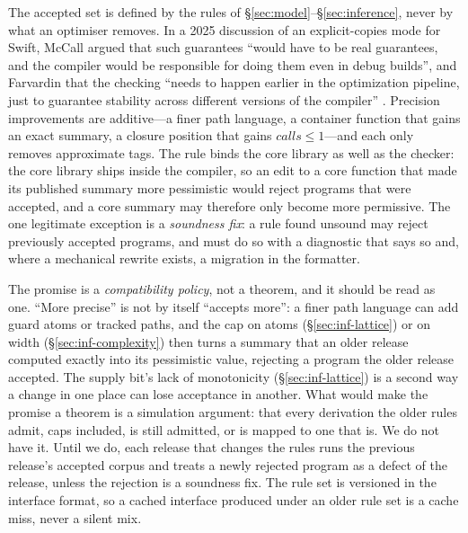 The accepted set is defined by the rules of \S\ref{sec:model}--\S\ref{sec:inference}, never by what an
optimiser removes. In a 2025 discussion of an explicit-copies mode for Swift, McCall argued that such
guarantees ``would have to be real guarantees, and the compiler would be responsible for doing them even
in debug builds'', and Farvardin that the checking ``needs to happen earlier in the optimization
pipeline, just to guarantee stability across different versions of the compiler''
\citep{swift2025explicitcopies}. Precision improvements are additive---a finer path language, a
container function that gains an exact summary, a closure position that gains $\mathit{calls} \le
1$---and each only removes approximate tags. The rule binds the core library as well as the checker:
the core library ships inside the compiler, so an edit to a core function that made its published summary
more pessimistic would reject programs that were accepted, and a core summary may therefore only become
more permissive. The one legitimate exception is a \emph{soundness fix}: a
rule found unsound may reject previously accepted programs, and must do so with a diagnostic that says
so and, where a mechanical rewrite exists, a migration in the formatter.

The promise is a \emph{compatibility policy}, not a theorem, and it should be read as one. ``More precise''
is not by itself ``accepts more'': a finer path language can add guard atoms or tracked paths, and the cap
on atoms (\S\ref{sec:inf-lattice}) or on width (\S\ref{sec:inf-complexity}) then turns a summary that an
older release computed exactly into its pessimistic value, rejecting a program the older release
accepted. The supply bit's lack of monotonicity (\S\ref{sec:inf-lattice}) is a second way a change in one
place can lose acceptance in another. What would make the promise a theorem is a simulation argument:
that every derivation the older rules admit, caps included, is still admitted, or is mapped to one that
is. We do not have it. Until we do, each release that changes the rules runs the previous release's
accepted corpus and treats a newly rejected program as a defect of the release, unless the rejection is a
soundness fix. The rule set is versioned in
the interface format, so a cached interface produced under an older rule set is a cache miss, never a
silent mix.
